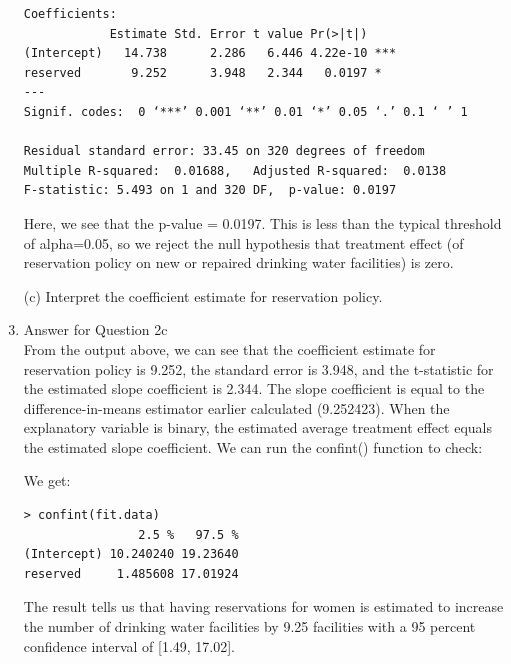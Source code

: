 \documentclass[12pt,letterpaper]{article}
\begin{document}
\begin{enumerate}
\begin{verbatim}
Coefficients:
            Estimate Std. Error t value Pr(>|t|)    
(Intercept)   14.738      2.286   6.446 4.22e-10 ***
reserved       9.252      3.948   2.344   0.0197 *  
---
Signif. codes:  0 ‘***’ 0.001 ‘**’ 0.01 ‘*’ 0.05 ‘.’ 0.1 ‘ ’ 1

Residual standard error: 33.45 on 320 degrees of freedom
Multiple R-squared:  0.01688,	Adjusted R-squared:  0.0138 
F-statistic: 5.493 on 1 and 320 DF,  p-value: 0.0197
\end{verbatim}
\noindent Here, we see that the p-value = 0.0197. This is less than the typical threshold of alpha=0.05, so we reject the null hypothesis that treatment effect (of reservation policy on new or repaired drinking water facilities) is zero.\\

	\vspace{6cm}
	\item [(c)] Interpret the coefficient estimate for reservation policy. 
						\item
Answer for Question 2c\\
\noindent From the output above, we can see that the coefficient estimate for reservation policy is 9.252, the standard error is 3.948, and the t-statistic for the estimated slope coefficient is 2.344. The slope coefficient is equal to the difference-in-means estimator earlier calculated (9.252423). When the  explanatory variable is binary, the estimated average treatment effect equals the estimated slope coefficient. We can run the confint() function to check:\\
\vspace{.5cm}
  
\vspace{.5cm}
\noindent We get:\\
\begin{verbatim}
> confint(fit.data)
                2.5 %   97.5 %
(Intercept) 10.240240 19.23640
reserved     1.485608 17.01924
\end{verbatim}
\noindent The result tells us that having reservations for women is estimated to increase the number of drinking water facilities by 9.25 facilities with a 95 percent confidence interval of [1.49, 17.02].\\

\end{enumerate}
\end{document}
